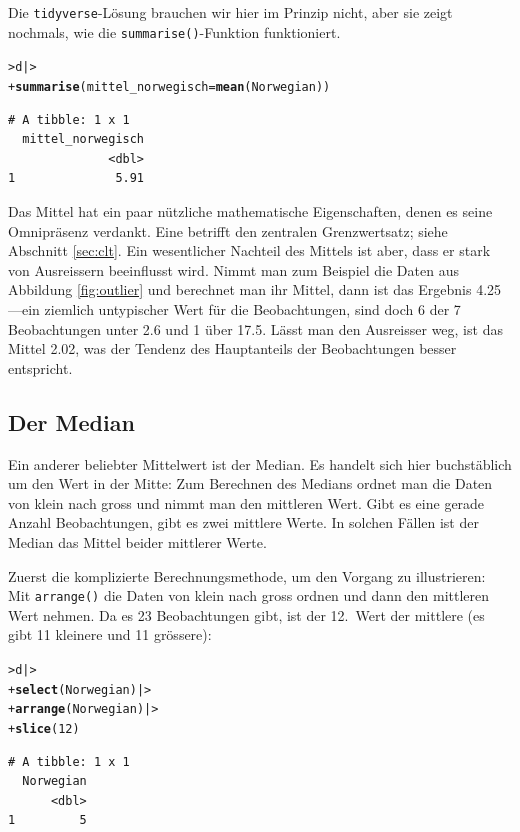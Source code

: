 \documentclass[oneside, 10pt]{book}\usepackage[]{graphicx}\usepackage[]{xcolor}
\makeatletter
\newcommand{\hlnum}[1]{\textcolor[rgb]{0.686,0.059,0.569}{#1}}%
\newcommand{\hlstd}[1]{\textcolor[rgb]{0.345,0.345,0.345}{#1}}%
\newcommand{\hlkwc}[1]{\textcolor[rgb]{0.333,0.667,0.333}{#1}}%
\newcommand{\hlkwd}[1]{\textcolor[rgb]{0.737,0.353,0.396}{\textbf{#1}}}%
\newenvironment{kframe}{%
 \def\at@end@of@kframe{}%
 \ifinner\ifhmode%
  \def\at@end@of@kframe{\end{minipage}}%
  \begin{minipage}{\columnwidth}%
 \fi\fi%
 \def\FrameCommand##1{\hskip\@totalleftmargin \hskip-\fboxsep
 \colorbox{shadecolor}{##1}\hskip-\fboxsep
     \hskip-\linewidth \hskip-\@totalleftmargin \hskip\columnwidth}%
 \MakeFramed {\advance\hsize-\width
   \@totalleftmargin\z@ \linewidth\hsize
   \@setminipage}}%
 {\par\unskip\endMakeFramed%
 \at@end@of@kframe}
\newenvironment{knitrout}{}{} %
\makeatother
\begin{document}
Die \texttt{tidyverse}-Lösung brauchen wir hier im Prinzip
nicht, aber sie zeigt nochmals, wie die \texttt{summarise()}-Funktion
funktioniert.
\begin{knitrout}
\color{fgcolor}\begin{kframe}
\begin{alltt}
\hlstd{> }\hlstd{d |>}
\hlstd{+ }  \hlkwd{summarise}\hlstd{(}\hlkwc{mittel_norwegisch} \hlstd{=} \hlkwd{mean}\hlstd{(Norwegian))}
\end{alltt}
\begin{verbatim}
# A tibble: 1 x 1
  mittel_norwegisch
              <dbl>
1              5.91
\end{verbatim}
\end{kframe}
\end{knitrout}

Das Mittel hat ein paar nützliche mathematische Eigenschaften,
denen es seine Omnipräsenz verdankt. Eine betrifft den zentralen Grenzwertsatz; siehe Abschnitt \ref{sec:clt}.
Ein wesentlicher Nachteil des Mittels ist aber, dass er stark von Ausreissern beeinflusst wird.
Nimmt man zum Beispiel die Daten aus Abbildung \vref{fig:outlier} und berechnet man ihr Mittel,
dann ist das Ergebnis 4.25---ein ziemlich untypischer Wert für die Beobachtungen,
sind doch 6 der 7 Beobachtungen unter 2.6 und 1 über 17.5. Lässt man den Ausreisser weg,
ist das Mittel 2.02, was der Tendenz des Hauptanteils der Beobachtungen besser entspricht.

\subsection{Der Median}
Ein anderer beliebter Mittelwert ist der Median.
Es handelt sich hier buchstäblich um den Wert in der Mitte:
Zum Berechnen des Medians ordnet man die Daten
von klein nach gross und nimmt man den mittleren Wert.
Gibt es eine gerade Anzahl Beobachtungen, gibt es zwei
mittlere Werte. In solchen Fällen ist der Median das Mittel beider
mittlerer Werte.

Zuerst die komplizierte Berechnungsmethode,
um den Vorgang zu illustrieren: Mit \texttt{arrange()}
die Daten von klein nach gross ordnen und dann den mittleren Wert
nehmen. Da es 23 Beobachtungen gibt,
ist der 12.\ Wert der mittlere
(es gibt 11 kleinere und 11 grössere):
\begin{knitrout}
\color{fgcolor}\begin{kframe}
\begin{alltt}
\hlstd{> }\hlstd{d |>}
\hlstd{+ }  \hlkwd{select}\hlstd{(Norwegian) |>}
\hlstd{+ }  \hlkwd{arrange}\hlstd{(Norwegian) |>}
\hlstd{+ }  \hlkwd{slice}\hlstd{(}\hlnum{12}\hlstd{)}
\end{alltt}
\begin{verbatim}
# A tibble: 1 x 1
  Norwegian
      <dbl>
1         5
\end{verbatim}
\end{kframe}
\end{knitrout}
\end{document}
